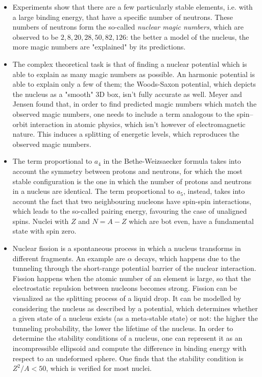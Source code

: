 \begin{itemize}
    \item Experiments show that there are a few particularly stable elements, i.e. with a large binding energy, that have a specific number of neutrons. These numbers of neutrons form the so-called \emph{nuclear magic numbers}, which are observed to be $2, 8, 20, 28, 50, 82, 126$: the better a model of the nucleus, the more magic numbers are "explained" by its predictions.
    \item The complex theoretical task is that of finding a nuclear potential which is able to explain as many magic numbers as possible. An harmonic potential is able to explain only a few of them; the Woods-Saxon potential, which depicts the nucleus as a "smooth" 3D box, isn't fully accurate as well. Meyer and Jensen found that, in order to find predicted magic numbers which match the observed magic numbers, one needs to include a term analogous to the spin--orbit interaction in atomic physics, which isn't however of electromagnetic nature. This induces a splitting of energetic levels, which reproduces the observed magic numbers.
    \item The term proportional to $a_4$ in the Bethe-Weizsaecker formula takes into account the symmetry between protons and neutrons, for which the most stable configuration is the one in which the number of protons and neutrons in a nucleus are identical.
    The term proportional to $a_5$, instead, takes into account the fact that two neighbouring nucleons have spin-spin interactions, which leads to the so-called pairing energy, favouring the case of unaligned spins. Nuclei with $Z$ and $N=A-Z$ which are bot even, have a fundamental state with spin zero.
    \item Nuclear fission is a spontaneous process in which a nucleus transforms in different fragments. An example are $\alpha$ decays, which happens due to the tunneling through the short-range potential barrier of the nuclear interaction. Fission happens when the atomic number of an element is large, so that the electrostatic repulsion between nucleons becomes strong. Fission can be visualized as the splitting process of a liquid drop. It can be modelled by considering the nucleus as described by a potential, which determines whether a given state of a nucleus exists (as a meta-stable state) or not: the higher the tunneling probability, the lower the lifetime of the nucleus. In order to determine the stability conditions of a nucleus, one can represent it as an incompressible ellipsoid and compute the difference in binding energy with respect to an undeformed sphere. One finds that the stability condition is $Z^2/A<50$, which is verified for most nuclei.

\end{itemize}
